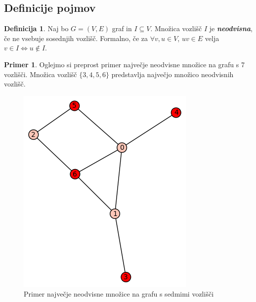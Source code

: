 \documentclass[a4paper, 12 pt]{article}
\theoremstyle{definition}
\newtheorem*{definicija}{Definicija}
\newtheorem*{primer}{Primer}
\theoremstyle{plain}
\theoremstyle{remark}
\begin{document}

\subsection{Definicije pojmov}

\begin{definicija}Naj bo $G = (V, E)$ graf in $I \subseteq V$. Množica vozlišč $I$ je \textbf{\textit{neodvisna}}, če ne vsebuje sosednjih vozlišč. 
\newline Formalno, če za $\forall v, u \in V$, $uv \in E$ velja $v \in I \Leftrightarrow  u \notin I$.
\end{definicija}

\begin{primer}
Oglejmo si preprost primer največje neodvisne množice na grafu s 7 vozlišči. Množica vozlišč $\{3, 4, 5, 6\}$ predstavlja največjo množico neodvisnih vozlišč.
\begin{figure}[H]
\centering
  \includegraphics[scale=0.4]{./Slike/neodvisna_zgled.png}
  \caption{Primer največje neodvisne množice na grafu s sedmimi vozlišči}
  \label{fig:primer7vozlisc} 
\end{figure}
\end{primer}
\end{document}
